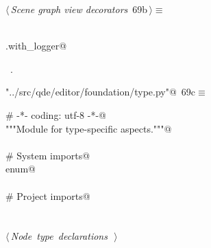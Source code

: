 \documentclass[
    a4paper,      %
    10pt,         %
    openright,    %
    notitlepage,  %
    parskip=half, %
]{scrreprt}       %
\theoremstyle{definition}                    %
\begin{document}
\begin{flushleft} \small
\begin{minipage}{\linewidth}\label{scrap118}\raggedright\small
{} $\langle\,${\itshape Scene graph view decorators}\nobreak\ {\footnotesize {69b}}$\,\rangle\equiv$
\vspace{-1ex}
\begin{list}{}{} \item
\mbox{}\lstinline@@\\
\mbox{}\lstinline@common.with_logger@\\
\mbox{}\lstinline@@{\NWsep}
\end{list}
\vspace{-1.5ex}
\footnotesize
\begin{list}{}{\setlength{\itemsep}{-\parsep}\setlength{\itemindent}{-\leftmargin}}
\item \NWtxtMacroRefIn\ .

\item{}
\end{list}
\end{minipage}\vspace{4ex}
\end{flushleft}
\begin{flushleft} \small
\begin{minipage}{\linewidth}\label{scrap119}\raggedright\small
{} \verb@"../src/qde/editor/foundation/type.py"@\nobreak\ {\footnotesize {69c}}$\equiv$
\vspace{-1ex}
\begin{list}{}{} \item
\mbox{}\lstinline@# -*- coding: utf-8 -*-@\\
\mbox{}\lstinline@"""Module for type-specific aspects."""@\\
\mbox{}\lstinline@@\\
\mbox{}\lstinline@# System imports@\\
\mbox{}\lstinline@import enum@\\
\mbox{}\lstinline@@\\
\mbox{}\lstinline@# Project imports@\\
\mbox{}\lstinline@@\\
\mbox{}\lstinline@@\\
\mbox{}\lstinline@@\hbox{$\langle\,${\itshape Node type declarations}\nobreak\ {\footnotesize {}}$\,\rangle$}\lstinline@@\\
\mbox{}\lstinline@@{\NWsep}
\end{list}
\vspace{-1.5ex}
\footnotesize
\begin{list}{}{\setlength{\itemsep}{-\parsep}\setlength{\itemindent}{-\leftmargin}}

\item{}
\end{list}
\end{minipage}\vspace{4ex}
\end{flushleft}
\end{document}
